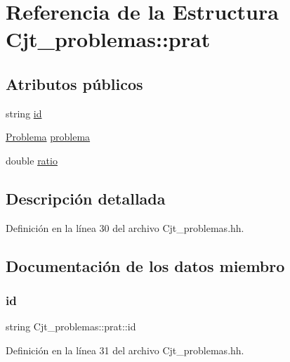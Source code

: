 \hypertarget{struct_cjt__problemas_1_1prat}{}\section{Referencia de la Estructura Cjt\+\_\+problemas\+:\+:prat}
\label{struct_cjt__problemas_1_1prat}
\subsection*{Atributos públicos}
\begin{DoxyCompactItemize}
\item 
string \mbox{\hyperlink{struct_cjt__problemas_1_1prat_a6d97326c9213c837aa9bff8159ffa061}{id}}
\item 
\mbox{\hyperlink{class_problema}{Problema}} \mbox{\hyperlink{struct_cjt__problemas_1_1prat_a9869c00019f5181043c0c7b32bfd165f}{problema}}
\item 
double \mbox{\hyperlink{struct_cjt__problemas_1_1prat_abc19a891cf42bf745b1d0e9736e7ca80}{ratio}}
\end{DoxyCompactItemize}


\subsection{Descripción detallada}


Definición en la línea 30 del archivo Cjt\+\_\+problemas.\+hh.



\subsection{Documentación de los datos miembro}
\mbox{\label{struct_cjt__problemas_1_1prat_a6d97326c9213c837aa9bff8159ffa061}} 
\subsubsection{\texorpdfstring{id}{id}}
{\footnotesize\ttfamily string Cjt\+\_\+problemas\+::prat\+::id}



Definición en la línea 31 del archivo Cjt\+\_\+problemas.\+hh.

\mbox{\label{struct_cjt__problemas_1_1prat_a9869c00019f5181043c0c7b32bfd165f}} 
